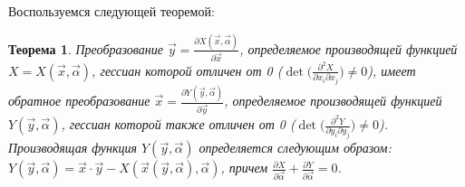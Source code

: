 \documentclass[12pt]{article}
\newtheorem{mytheorem}{Теорема}[]
\begin{document}
Воспользуемся следующей теоремой:

\begin{mytheorem}
Преобразование $\vec{y} = \frac{\partial X(\vec{x}, \vec{\alpha})}{\partial \vec{x}}$, определяемое производящей функцией $X = X(\vec{x}, \vec{\alpha})$, гессиан которой отличен от 0 ($\det \bigl( \frac{\partial ^2 X}{\partial x_i \partial x_j} \bigr) \neq 0$), имеет обратное преобразование $\vec{x} = \frac{\partial Y(\vec{y}, \vec{\alpha})}{\partial \vec{y}}$, определяемое производящей функцией $Y(\vec{y}, \vec{\alpha})$, гессиан которой также отличен от 0 ($\det \bigl( \frac{\partial ^2 Y}{\partial y_i \partial y_j} \bigr) \neq 0$). Производящая функция $Y(\vec{y}, \vec{\alpha})$ определяется следующим образом: $Y(\vec{y}, \vec{\alpha}) = \vec{x} \cdot \vec{y} - X(\vec{x}(\vec{y}, \vec{\alpha}), \vec{\alpha})$, причем $\frac{\partial X}{\partial \vec{\alpha}} + \frac{\partial Y}{\partial \vec{\alpha}} = 0$.
\end{mytheorem}
\end{document}
